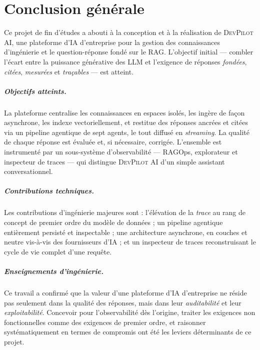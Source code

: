 \documentclass[12pt,a4paper,oneside]{report}
\newcommand{\devpilot}{\textsc{DevPilot AI}}
\begin{document}
\chapter*{Conclusion générale}

Ce projet de fin d'études a abouti à la conception et à la réalisation de
\devpilot{}, une plateforme d'IA d'entreprise pour la gestion des connaissances
d'ingénierie et le question-réponse fondé sur le RAG. L'objectif initial — combler
l'écart entre la puissance générative des LLM et l'exigence de réponses
\emph{fondées}, \emph{citées}, \emph{mesurées} et \emph{traçables} — est atteint.

\paragraph{Objectifs atteints.} La plateforme centralise les connaissances en
espaces isolés, les ingère de façon asynchrone, les indexe vectoriellement, et
restitue des réponses ancrées et citées via un pipeline agentique de sept agents,
le tout diffusé en \emph{streaming}. La qualité de chaque réponse est évaluée et,
si nécessaire, corrigée. L'ensemble est instrumenté par un sous-système
d'observabilité — RAGOps, explorateur et inspecteur de traces — qui distingue
\devpilot{} d'un simple assistant conversationnel.

\paragraph{Contributions techniques.} Les contributions d'ingénierie majeures
sont : l'élévation de la \emph{trace} au rang de concept de premier ordre du
modèle de données ; un pipeline agentique entièrement persisté et inspectable ;
une architecture asynchrone, en couches et neutre vis-à-vis des fournisseurs d'IA ;
et un inspecteur de traces reconstruisant le cycle de vie complet d'une requête.

\paragraph{Enseignements d'ingénierie.} Ce travail a confirmé que la valeur d'une
plateforme d'IA d'entreprise ne réside pas seulement dans la qualité des réponses,
mais dans leur \emph{auditabilité} et leur \emph{exploitabilité}. Concevoir pour
l'observabilité dès l'origine, traiter les exigences non fonctionnelles comme des
exigences de premier ordre, et raisonner systématiquement en termes de compromis
ont été les leviers déterminants de ce projet.
\end{document}

